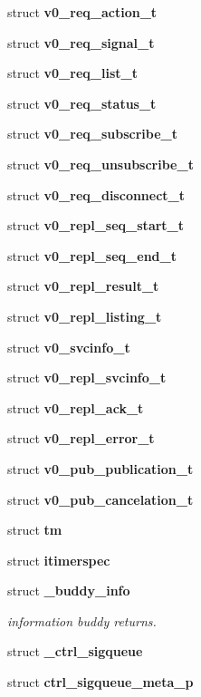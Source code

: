 \begin{DoxyCompactItemize}
struct {\bf v0\_\-req\_\-action\_\-t}
\item 
struct {\bf v0\_\-req\_\-signal\_\-t}
\item 
struct {\bf v0\_\-req\_\-list\_\-t}
\item 
struct {\bf v0\_\-req\_\-status\_\-t}
\item 
struct {\bf v0\_\-req\_\-subscribe\_\-t}
\item 
struct {\bf v0\_\-req\_\-unsubscribe\_\-t}
\item 
struct {\bf v0\_\-req\_\-disconnect\_\-t}
\item 
struct {\bf v0\_\-repl\_\-seq\_\-start\_\-t}
\item 
struct {\bf v0\_\-repl\_\-seq\_\-end\_\-t}
\item 
struct {\bf v0\_\-repl\_\-result\_\-t}
\item 
struct {\bf v0\_\-repl\_\-listing\_\-t}
\item 
struct {\bf v0\_\-svcinfo\_\-t}
\item 
struct {\bf v0\_\-repl\_\-svcinfo\_\-t}
\item 
struct {\bf v0\_\-repl\_\-ack\_\-t}
\item 
struct {\bf v0\_\-repl\_\-error\_\-t}
\item 
struct {\bf v0\_\-pub\_\-publication\_\-t}
\item 
struct {\bf v0\_\-pub\_\-cancelation\_\-t}
\item 
struct {\bf tm}
\item 
struct {\bf itimerspec}
\item 
struct {\bf \_\-buddy\_\-info}
\begin{DoxyCompactList}\small\item\em information buddy returns. \end{DoxyCompactList}\item 
struct {\bf \_\-ctrl\_\-sigqueue}
\item 
struct {\bf ctrl\_\-sigqueue\_\-meta\_\-p}
\end{DoxyCompactItemize}
